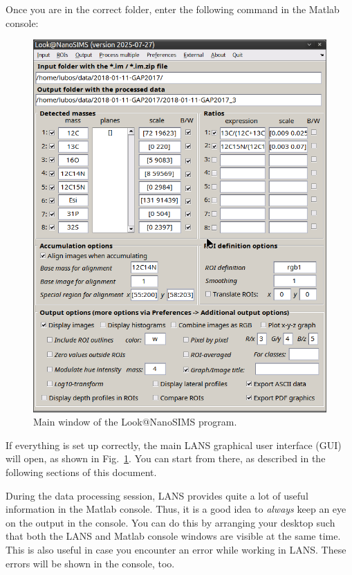 

\s Once you are in the correct folder, enter the following command in the Matlab console:


\begin{figure}[!t]
\centering
\includegraphics[scale=0.5]{figs1/LANS-maingui}
\caption{\label{fig1:mainLANSgui}%
Main window of the Look@NanoSIMS program.}
\end{figure}

\nb\bul If everything is set up correctly, the main LANS graphical user interface (GUI) will open, as shown in Fig.~\ref{fig1:mainLANSgui}. You can start from there, as described in the following sections of this document. 

\bul
During the data processing session, LANS provides quite a lot of useful information in the Matlab console. Thus, it is a good idea to \emph{always} keep an eye on the output in the console. You can do this by arranging your desktop such that both the LANS and Matlab console windows are visible at the same time. This is also useful in case you encounter an error while working in LANS. These errors will be shown in the console, too.

